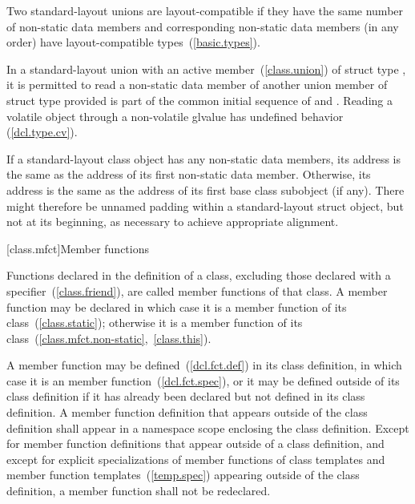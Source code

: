 \pnum
Two standard-layout unions are layout-compatible if they
have the same number of non-static data members and corresponding
non-static data members (in any order) have layout-compatible
types~(\ref{basic.types}).

\pnum
In a standard-layout union with an active member~(\ref{class.union})
of struct type , it is permitted to read a non-static
data member  of another union member of struct type 
provided  is part of the common initial sequence of  and .
\enternote
Reading a volatile object through a non-volatile glvalue has
undefined behavior (\ref{dcl.type.cv}).
\exitnote

\pnum
If a standard-layout class object has any non-static data members, its address
is the same as the address of its first non-static data member. Otherwise, its
address is the same as the address of its first base class subobject (if any).
\enternote
There might therefore be unnamed padding within a standard-layout struct object, but
not at its beginning, as necessary to achieve appropriate alignment.
\exitnote

[class.mfct]{Member functions}%

\pnum
Functions declared in the definition of a class, excluding those
declared with a  specifier~(\ref{class.friend}), are
called member functions of that class. A member function may be declared
 in which case it is a  member function
of its class~(\ref{class.static}); otherwise it is a
 member function of its
class~(\ref{class.mfct.non-static},~\ref{class.this}).

\pnum
{}%
%
A member function may be defined~(\ref{dcl.fct.def}) in its class
definition, in which case it is an  member
function~(\ref{dcl.fct.spec}), or it may be defined outside of its class
definition if it has already been declared but not defined in its class
definition. A member function definition that appears outside of the
class definition shall appear in a namespace scope enclosing the class
definition. Except for member function definitions that appear outside
of a class definition, and except for explicit specializations of member
functions of class templates and member function
templates~(\ref{temp.spec}) appearing outside of the class definition, a
member function shall not be redeclared.

